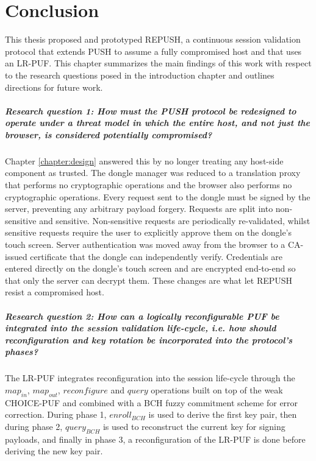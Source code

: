 
\chapter{Conclusion}
\label{chapter:conclusions}

This thesis proposed and prototyped REPUSH, a continuous session validation protocol that extends PUSH to assume a fully compromised host and that uses an LR-PUF. This chapter summarizes the main findings of this work with respect to the research questions posed in the introduction chapter and outlines directions for future work.

\paragraph{Research question 1: How must the PUSH protocol be redesigned to operate under a threat model in which the entire host, and not just the browser, is considered potentially compromised?} Chapter \ref{chapter:design} answered this by no longer treating any host-side component as trusted. The dongle manager was reduced to a translation proxy that performs no cryptographic operations and the browser also performs no cryptographic operations. Every request sent to the dongle must be signed by the server, preventing any arbitrary payload forgery. Requests are split into non-sensitive and sensitive. Non-sensitive requests are periodically re-validated, whilst sensitive requests require the user to explicitly approve them on the dongle's touch screen. Server authentication was moved away from the browser to a CA-issued certificate that the dongle can independently verify. Credentials are entered directly on the dongle's touch screen and are encrypted end-to-end so that only the server can decrypt them. These changes are what let REPUSH resist a compromised host.

\paragraph{Research question 2: How can a logically reconfigurable PUF be integrated into the session validation life-cycle, i.e. how should reconfiguration and key rotation be incorporated into the protocol's phases?} The LR-PUF integrates reconfiguration into the session life-cycle through the $map_{in}$, $map_{out}$, $reconfigure$ and $query$ operations built on top of the weak CHOICE-PUF and combined with a BCH fuzzy commitment scheme for error correction. During phase 1, $enroll_{BCH}$ is used to derive the first key pair, then during phase 2, $query_{BCH}$ is used to reconstruct the current key for signing payloads, and finally in phase 3, a reconfiguration of the LR-PUF is done before deriving the new key pair.

